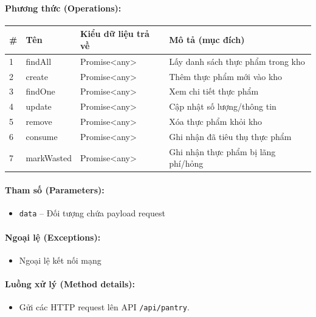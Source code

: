 \documentclass[12pt,a4paper]{article}
\begin{document}
\paragraph{Phương thức (Operations):}
\begin{longtable}{|p{0.6cm}|p{5.0cm}|p{2.8cm}|p{5.4cm}|}
\hline
\textbf{\#} & \textbf{Tên} & \textbf{Kiểu dữ liệu trả về} & \textbf{Mô tả (mục đích)} \\ \hline
\endhead
1 & findAll & Promise\textless{}any\textgreater{} & Lấy danh sách thực phẩm trong kho \\ \hline
2 & create & Promise\textless{}any\textgreater{} & Thêm thực phẩm mới vào kho \\ \hline
3 & findOne & Promise\textless{}any\textgreater{} & Xem chi tiết thực phẩm \\ \hline
4 & update & Promise\textless{}any\textgreater{} & Cập nhật số lượng/thông tin \\ \hline
5 & remove & Promise\textless{}any\textgreater{} & Xóa thực phẩm khỏi kho \\ \hline
6 & consume & Promise\textless{}any\textgreater{} & Ghi nhận đã tiêu thụ thực phẩm \\ \hline
7 & markWasted & Promise\textless{}any\textgreater{} & Ghi nhận thực phẩm bị lãng phí/hỏng \\ \hline
\end{longtable}

\paragraph{Tham số (Parameters):}
\begin{itemize}[leftmargin=*]
    \item \texttt{data} – Đối tượng chứa payload request
\end{itemize}


\paragraph{Ngoại lệ (Exceptions):}
\begin{itemize}[leftmargin=*]
    \item Ngoại lệ kết nối mạng
\end{itemize}


\paragraph{Luồng xử lý (Method details):}
\begin{itemize}[leftmargin=*]
    \item Gửi các HTTP request lên API \texttt{/api/pantry}.
\end{itemize}
\end{document}
